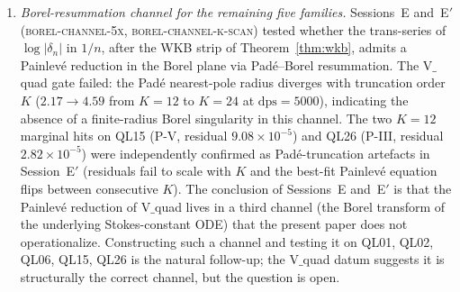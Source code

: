 \documentclass[12pt]{amsart}
\theoremstyle{definition}
\begin{document}
\begin{enumerate}
series. This is the natural next session in the SIARC pipeline.
\item \emph{Borel-resummation channel for the remaining five
families.}\label{op:borel-channel} Sessions~E and~E$'$
(\textsc{borel-channel-5x}, \textsc{borel-channel-k-scan}) tested
whether the trans-series of $\log|\delta_{n}|$ in $1/n$, after the
WKB strip of Theorem~\ref{thm:wkb}, admits a Painlev\'e reduction in
the Borel plane via Pad\'e--Borel resummation. The V$\_$quad gate
failed: the Pad\'e nearest-pole radius diverges with truncation
order $K$ ($2.17\to 4.59$ from $K=12$ to $K=24$ at $\mathrm{dps}=5000$),
indicating the absence of a finite-radius Borel singularity in this
channel. The two $K=12$ marginal hits on QL15 (P-V, residual
$9.08\times 10^{-5}$) and QL26 (P-III, residual $2.82\times 10^{-5}$)
were independently confirmed as Pad\'e-truncation artefacts in
Session~E$'$ (residuals fail to scale with $K$ and the best-fit
Painlev\'e equation flips between consecutive $K$). The conclusion
of Sessions~E and~E$'$ is that the Painlev\'e reduction of
V$\_$quad lives in a third channel (the Borel transform of the
underlying Stokes-constant ODE) that the present paper does not
operationalize. Constructing such a channel and testing it on QL01,
QL02, QL06, QL15, QL26 is the natural follow-up; the V$\_$quad
datum suggests it is structurally the correct channel, but the
question is open.
\end{enumerate}
\end{document}

